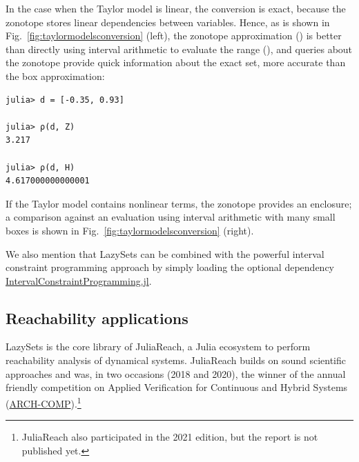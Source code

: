 In the case when the Taylor model is linear, the conversion is exact, because the zonotope stores linear dependencies between variables.
%
Hence, as is shown in Fig.~\ref{fig:taylormodelsconversion} (left), the zonotope approximation () is better than directly using interval arithmetic to evaluate the range (), and queries about the zonotope provide quick information about the exact set, more accurate than the box approximation:

\begin{minipage}{\linewidth}
	\begin{lstlisting}
julia> d = [-0.35, 0.93]
 
julia> ρ(d, Z)
3.217

julia> ρ(d, H)
4.617000000000001
\end{lstlisting}
\end{minipage}

If the Taylor model contains nonlinear terms, the zonotope provides an enclosure; a comparison against an evaluation using interval arithmetic with many small boxes is shown in Fig.~\ref{fig:taylormodelsconversion} (right).

\smallskip

We also mention that LazySets can be combined with the powerful interval constraint programming approach by simply loading the optional dependency \href{https://github.com/JuliaIntervals/IntervalConstraintProgramming.jl}{IntervalConstraintProgramming.jl}.


\subsection{Reachability applications}

LazySets is the core library of JuliaReach, a Julia ecosystem to perform reachability analysis of dynamical systems.
%
JuliaReach builds on sound scientific approaches and was, in two occasions (2018 and 2020), the winner of the annual friendly competition on Applied Verification for Continuous and Hybrid Systems (\href{https://cps-vo.org/group/ARCH}{ARCH-COMP}).\footnote{JuliaReach also participated in the 2021 edition, but the report is not published yet.}

\smallskip

